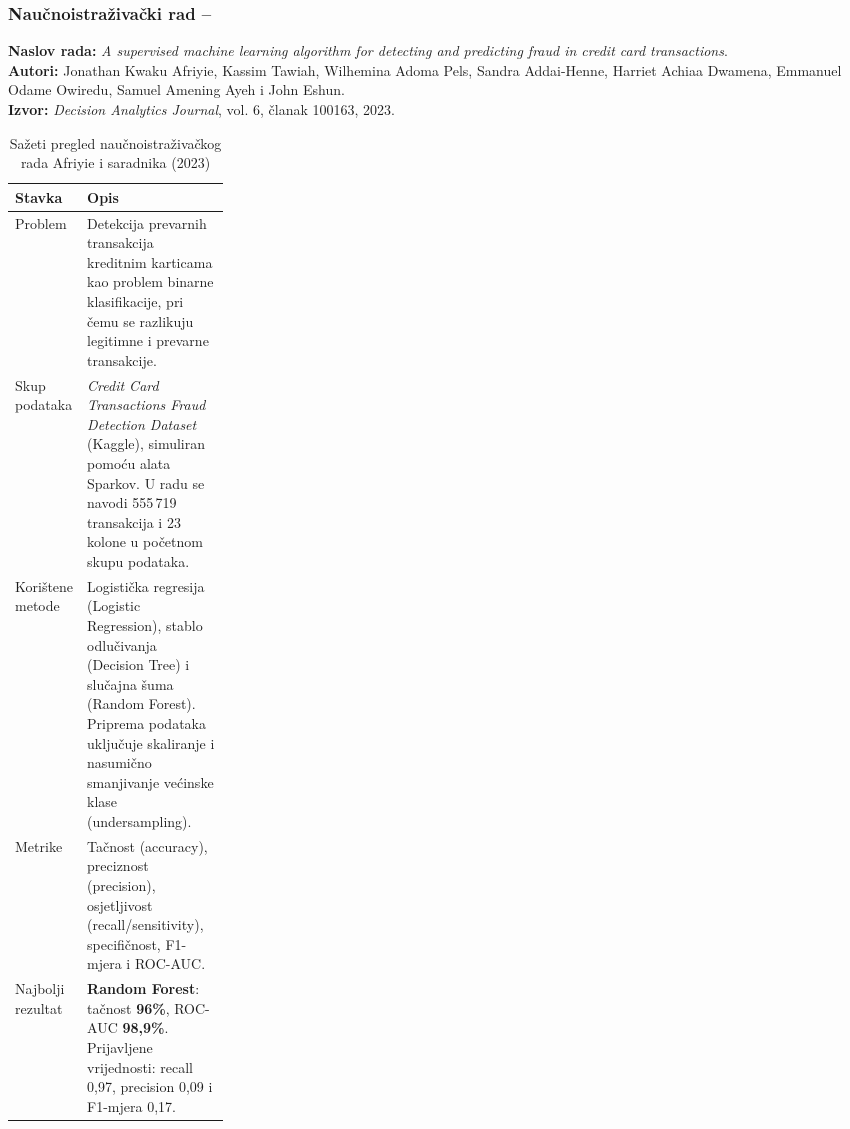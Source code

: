 \subsubsection*{Naučnoistraživački rad -- \ClanJedan}

\textbf{Naslov rada:}
\emph{A supervised machine learning algorithm for detecting
and predicting fraud in credit card transactions}.\\

\textbf{Autori:}
Jonathan Kwaku Afriyie, Kassim Tawiah, Wilhemina Adoma Pels,
Sandra Addai-Henne, Harriet Achiaa Dwamena, Emmanuel Odame Owiredu,
Samuel Amening Ayeh i John Eshun.\\

\textbf{Izvor:}
\emph{Decision Analytics Journal}, vol. 6, članak 100163,
2023. \cite{afriyie2023fraud}

\begin{table}[H]
\centering
\caption{Sažeti pregled naučnoistraživačkog rada Afriyie i saradnika (2023)}
\label{tab:afriyie-pregled}
\small
\renewcommand{\arraystretch}{1.22}
\begin{tabularx}{\linewidth}{@{}p{0.25\linewidth}Y@{}}
\toprule
\textbf{Stavka} & \textbf{Opis} \\
\midrule

Problem &
Detekcija prevarnih transakcija kreditnim karticama kao problem
binarne klasifikacije, pri čemu se razlikuju legitimne i
prevarne transakcije. \\

Skup podataka &
\emph{Credit Card Transactions Fraud Detection Dataset}
(Kaggle), simuliran pomoću alata Sparkov.
U radu se navodi 555\,719 transakcija i 23 kolone
u početnom skupu podataka. \\

Korištene metode &
Logistička regresija (Logistic Regression),
stablo odlučivanja (Decision Tree) i slučajna šuma
(Random Forest). Priprema podataka uključuje
skaliranje i nasumično smanjivanje većinske klase
(undersampling). \\

Metrike &
Tačnost (accuracy), preciznost (precision),
osjetljivost (recall/sensitivity), specifičnost,
F1-mjera i ROC-AUC. \\

Najbolji rezultat &
\textbf{Random Forest}: tačnost \textbf{96\%},
ROC-AUC \textbf{98,9\%}.
Prijavljene vrijednosti: recall 0,97,
precision 0,09 i F1-mjera 0,17. \\

\bottomrule
\end{tabularx}
\end{table}
